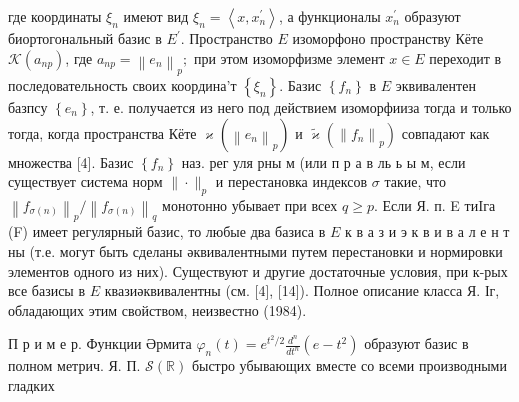\documentclass[10pt]{article}
\begin{document}
где координаты $\xi_{n}$ имеют вид $\xi_{n}=\left\langle x, x_{n}^{\prime}\right\rangle$, а функционалы $x_{n}^{\prime}$ образуют биортогональный базис в $E^{\prime}$. Пространство $E$ изоморфоно пространству Кёте $\mathscr{K}\left(a_{n p}\right)$, где $a_{n p}=\left\|e_{n}\right\|_{p} ;$ при этом изоморфизме элемент $x \in E$ переходит в последовательность своих координа'т $\left\{\xi_{n}\right\}$. Базис $\left\{f_{n}\right\}$ в $E$ эквивалентен базпсу $\left\{e_{n}\right\}$, т. е. получается из него под действием изоморфииза тогда и только тогда, когда пространства Кёте $\mathscr{\varkappa}\left(\left\|e_{n}\right\|_{p}\right)$ и $\tilde{\varkappa}\left(\left\|f_{n}\right\|_{p}\right)$ совпадают как множества [4]. Базис $\left\{f_{n}\right\}$ наз. рег уля рны м (или п р а в ль ь ы м, если существует система норм $\|\cdot\|_{p}$ и перестановка индексов $\sigma$ такие, что $\left\|f_{\sigma(n)}\right\|_{p} /\left\|f_{\sigma(n)}\right\|_{q}$ монотонно убывает при всех $q \geqslant p$. Если Я. п. E тиIга (F) имеет регулярный базис, то любые два базиса в $E$ к в а з и э к в и в а л е н т ны (т.е. могут быть сделаны әквивалентными путем перестановки и нормировки элементов одного из них). Существуют и другие достаточные условия, при к-рых все базисы в $E$ квазиәквивалентны (см. [4], [14]). Полное описание класса Я. Іг, обладающих этим свойством, неизвестно (1984).



П р и м е р. Функции Әрмита $\varphi_{n}(t)=e^{t^{2} / 2} \frac{d^{n}}{d t^{n}}\left(e-t^{2}\right)$ образуют базис в полном метрич. Я. П. $\mathscr{S}(\mathbb{R})$ быстро убывающих вместе со всеми производными гладких
\end{document}
